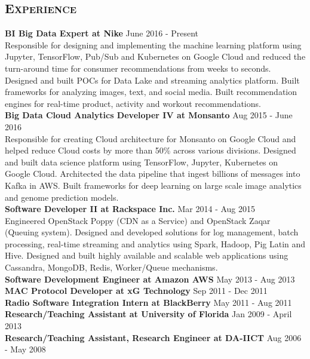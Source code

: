 \begin{resume}
\section{\textsc{Experience}}
\textbf{BI Big Data Expert at Nike} \hfill June 2016 - Present\\
Responsible for designing and implementing the machine learning platform using Jupyter, TensorFlow, Pub/Sub and Kubernetes on Google Cloud and reduced the turn-around time for consumer recommendations from weeks to seconds. Designed and built POCs for Data Lake and streaming analytics platform. Built frameworks for analyzing images, text, and social media. Built recommendation engines for real-time product, activity and workout recommendations.\\
\textbf{Big Data Cloud Analytics Developer IV at Monsanto} \hfill Aug 2015 - June 2016\\
Responsible for creating Cloud architecture for Monsanto on Google Cloud and helped reduce Cloud costs by more than 50\% across various divisions. Designed and built data science platform using TensorFlow, Jupyter, Kubernetes on Google Cloud. Architected the data pipeline that ingest billions of messages into Kafka in AWS. Built frameworks for deep learning on large scale image analytics and genome prediction models.\\
\textbf{Software Developer II at Rackspace Inc.} \hfill Mar 2014 - Aug 2015\\
Engineered OpenStack Poppy (CDN as a Service) and OpenStack Zaqar (Queuing system). Designed and developed solutions for log management, batch processing, real-time streaming and analytics using Spark, Hadoop, Pig Latin and Hive. Designed and built highly available and scalable web applications using Cassandra, MongoDB, Redis, Worker/Queue mechanisms.\\
\textbf{Software Development Engineer at Amazon AWS} \hfill May 2013 - Aug 2013\\
\textbf{MAC Protocol Developer at xG Technology} \hfill Sep 2011 - Dec 2011\\
\textbf{Radio Software Integration Intern at BlackBerry} \hfill May 2011 - Aug 2011\\
\textbf{Research/Teaching Assistant at University of Florida} \hfill Jan 2009 - April 2013\\
\textbf{Research/Teaching Assistant, Research Engineer at DA-IICT} \hfill Aug 2006 - May 2008

\begin{formatb}
  \\
  \body\\
\end{formatb}


\end{resume}
